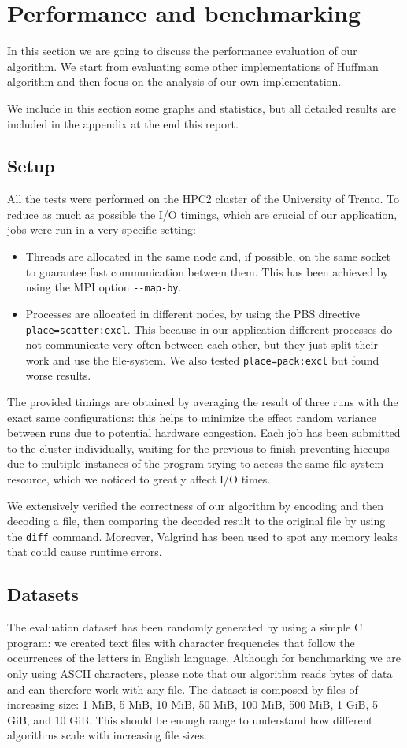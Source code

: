 \section{Performance and benchmarking}
In this section we are going to discuss the performance evaluation of our algorithm. We start from evaluating some other implementations of Huffman algorithm and then focus on the analysis of our own implementation. 

We include in this section some graphs and statistics, but all detailed results are included in the appendix at the end this report.
\subsection{Setup}
All the tests were performed on the HPC2 cluster of the University of Trento. To reduce as much as possible the I/O timings, which are crucial of our application, jobs were run in a very specific setting:

\begin{itemize}
	\item Threads are allocated in the same node and, if possible, on the same socket to guarantee fast communication between them. This has been achieved by using the MPI option \verb|--map-by|.
	\item Processes are allocated in different nodes, by using the PBS directive \verb|place=scatter:excl|. This because in our application different processes do not communicate very often between each other, but they just split their work and use the file-system. We also tested \verb|place=pack:excl| but found worse results.
\end{itemize}

The provided timings are obtained by averaging the result of three runs with the exact same configurations: this helps to minimize the effect random variance between runs due to potential hardware congestion.
Each job has been submitted to the cluster individually, waiting for the previous to finish preventing hiccups due to multiple instances of the program trying to access the same file-system resource, which we noticed to greatly affect I/O times.

We extensively verified the correctness of our algorithm by encoding and then decoding a file, then comparing the decoded result to the original file by using the \verb|diff| command. Moreover, Valgrind has been used to spot any memory leaks that could cause runtime errors.

\subsection{Datasets}
The evaluation dataset has been randomly generated by using a simple C program: we created text files with character frequencies that follow the occurrences of the letters in English language. Although for benchmarking we are only using ASCII characters, please note that our algorithm reads bytes of data and can therefore work with any file.
The dataset is composed by files of increasing size: 1 MiB, 5 MiB, 10 MiB, 50 MiB, 100 MiB, 500 MiB, 1 GiB, 5 GiB, and 10 GiB. This should be enough range to understand how different algorithms scale with increasing file sizes.

